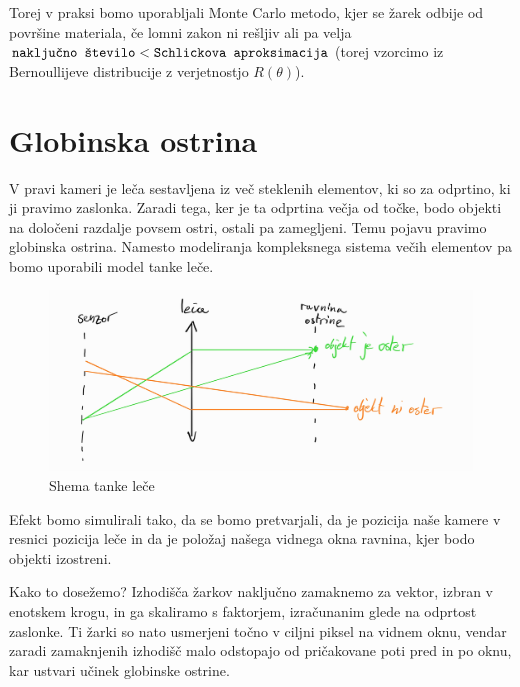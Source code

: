 \documentclass[12pt, a4paper]{article}
\begin{document}
Torej v praksi bomo uporabljali Monte Carlo metodo, kjer se žarek odbije od površine materiala, če lomni zakon
ni rešljiv ali pa velja $\verb|naključno število| < \verb|Schlickova aproksimacija|$ (torej vzorcimo
iz Bernoullijeve distribucije z verjetnostjo $R(\theta)$).

\section{Globinska ostrina}

V pravi kameri je leča sestavljena iz več steklenih elementov, ki so za odprtino, ki ji pravimo zaslonka.
Zaradi tega, ker je ta odprtina večja od točke, bodo objekti na določeni razdalje povsem ostri, ostali pa
zamegljeni. Temu pojavu pravimo globinska ostrina. Namesto modeliranja kompleksnega sistema večih elementov
pa bomo uporabili model tanke leče.

\begin{figure}[H]
	\centering
	\includegraphics[width=\textwidth]{leca}
	\caption{Shema tanke leče}
\end{figure}

Efekt bomo simulirali tako, da se bomo pretvarjali, da je pozicija naše kamere v resnici pozicija leče in
da je položaj našega vidnega okna ravnina, kjer bodo objekti izostreni.

Kako to dosežemo? Izhodišča žarkov naključno zamaknemo za vektor, izbran v enotskem krogu, in ga skaliramo s
faktorjem, izračunanim glede na odprtost zaslonke. Ti žarki so nato usmerjeni točno v ciljni piksel na vidnem
oknu, vendar zaradi zamaknjenih izhodišč malo odstopajo od pričakovane poti pred in po oknu, kar ustvari učinek
globinske ostrine.

\printbibliography
\end{document}
